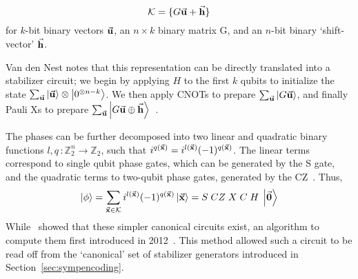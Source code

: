\[
    \mathcal{K}=\{G\va{u} + \va{h}\}
\]
for $k$-bit binary vectors $\va{u}$, an $n\times k$ binary matrix G, and an $n$-bit binary `shift-vector' $\va{h}$.\par
Van den Nest notes that this representation can be directly translated into a stabilizer circuit; we begin by applying $H$ to the first $k$ qubits to initialize the state $\sum_{\va{u}}\ket{\va{u}}\otimes\ket{0^{\otimes n-k}}$. We then apply CNOTs to prepare $\sum_{\va{u}}\ket{G\va{u}}$, and finally Pauli Xs to prepare $\sum_{\va{u}}\ket{G\va{u}\oplus \va{h}}$~\cite{VandenNest2008}.\par
The phases can be further decomposed into two linear and quadratic binary functions $l,q\,:\mathbb{Z}_{2}^{n}\rightarrow\mathbb{Z}_{2}$, such that $i^{q(\va{x})}=i^{l(\va{x})}(-1)^{q(\va{x})}$. The linear terms correspond to single qubit phase gates, which can be generated by the S gate, and the quadratic terms to two-qubit phase gates, generated by the CZ~\cite{VandenNest2008}. Thus,
\begin{equation}
\ket{\phi}=\sum_{\va{x}\in\mathcal{K}}i^{l(\va{x})}(-1)^{q(\va{x})}\ket{\va{x}} = S\;CZ\;X\;C\;H\;\ket{\va{0}}
\label{eq:expandedaffinecirc}
\end{equation}
While~\cite{VandenNest2008} showed that these simpler canonical circuits exist, an algorithm to compute them first introduced in 2012~\cite{Garcia2012}. This method allowed such a circuit to be read off from the `canonical' set of stabilizer generators introduced in Section~\ref{sec:sympencoding}. 
